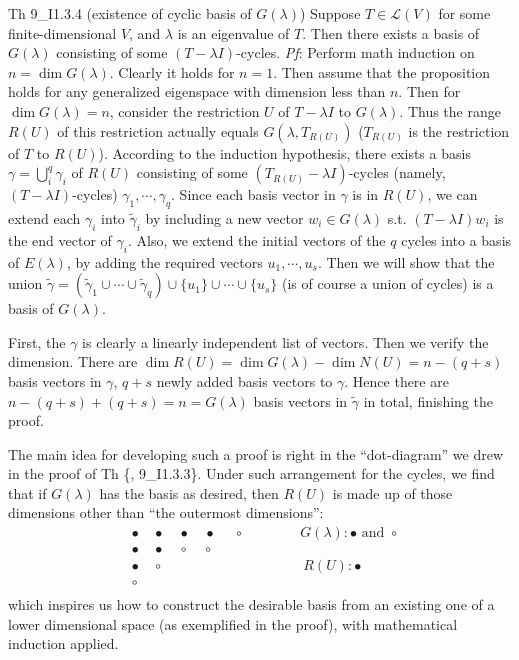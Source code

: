 \documentclass{article}
\begin{document}
\begin{Th}{Th 9\_I1.3.4 (existence of cyclic basis of $G(\lambda)$)}
    Suppose $T\in\mathcal{L}(V)$ for some finite-dimensional $V$, and $\lambda$ is an eigenvalue of $T$. Then there exists a basis of $G(\lambda)$ consisting of some $(T-\lambda I)$-cycles.
    \tcblower
    \textit{Pf}: Perform math induction on $n = \dim G(\lambda)$. Clearly it holds for $n=1$. Then assume that the proposition holds for any generalized eigenspace with dimension less than $n$. Then for $\dim G(\lambda) = n$, consider the restriction $U$ of $T-\lambda I$ to $G(\lambda)$. Thus the range $R(U)$ of this restriction actually equals $G(\lambda, T_{R(U)})$ ($T_{R(U)}$ is the restriction of $T$ to $R(U)$). According to the induction hypothesis, there exists a basis $\gamma = \bigcup_i^q \gamma_i$ of $R(U)$ consisting of some $(T_{R(U)}-\lambda I)$-cycles (namely, $(T-\lambda I)$-cycles) $\gamma_1, \cdots, \gamma_q$. Since each basis vector in $\gamma$ is in $R(U)$, we can extend each $\gamma_i$ into $\tilde{\gamma}_i$ by including a new vector $w_i\in G(\lambda)$ s.t. $(T-\lambda I)w_i$ is the end vector of $\gamma_i$. Also, we extend the initial vectors of the $q$ cycles into a basis of $E(\lambda)$, by adding the required vectors $u_1, \cdots, u_s$. Then we will show that the union $\tilde{\gamma} = \left(\tilde{\gamma}_1\cup\cdots\cup\tilde{\gamma}_q\right)\cup\{u_1\}\cup\cdots\cup\{u_s\}$ (is of course a union of cycles) is a basis of $G(\lambda)$.

    First, the $\gamma$ is clearly a linearly independent list of vectors. Then we verify the dimension. There are $\dim R(U) = \dim G(\lambda)-\dim N(U) = n-(q+s)$ basis vectors in $\gamma$, $q+s$ newly added basis vectors to $\gamma$. Hence there are $n-(q+s)+(q+s) = n = G(\lambda)$ basis vectors in $\tilde{\gamma}$ in total, finishing the proof.
\end{Th}

The main idea for developing such a proof is right in the ``dot-diagram'' we drew in the proof of Th \{, 9\_I1.3.3\}. Under such arrangement for the cycles, we find that if $G(\lambda)$ has the basis as desired, then $R(U)$ is made up of those dimensions other than ``the outermost dimensions'':
$$
\begin{aligned}
    & \bullet \quad \bullet \quad \bullet \quad \bullet \quad\; \circ \qquad \qquad G(\lambda): \bullet \text{ and } \circ \\
    & \bullet \quad \bullet \quad \circ \quad \circ \\
    & \bullet \quad \circ \qquad\qquad\qquad\qquad\qquad R(U): \bullet\\
    & \circ \quad \\
\end{aligned}
$$
which inspires us how to construct the desirable basis from an existing one of a lower dimensional space (as exemplified in the proof), with mathematical induction applied.
\end{document}
